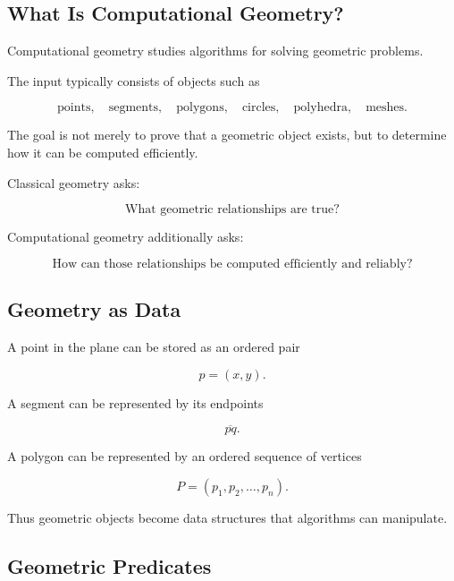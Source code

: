 \subsection{What Is Computational Geometry?}
\label{subsec:what-is-computational-geometry}

Computational geometry studies algorithms for solving geometric problems.

The input typically consists of objects such as

\[
\boxed{
\text{points},
\quad
\text{segments},
\quad
\text{polygons},
\quad
\text{circles},
\quad
\text{polyhedra},
\quad
\text{meshes}.
}
\]

The goal is not merely to prove that a geometric object exists, but to
determine how it can be computed efficiently.

\begin{conceptbox}
Classical geometry asks:

\[
\text{What geometric relationships are true?}
\]

Computational geometry additionally asks:

\[
\boxed{
\text{How can those relationships be computed efficiently and reliably?}
}
\]
\end{conceptbox}

\subsection{Geometry as Data}
\label{subsec:geometry-as-data}

A point in the plane can be stored as an ordered pair

\[
p=(x,y).
\]

A segment can be represented by its endpoints

\[
\overline{pq}.
\]

A polygon can be represented by an ordered sequence of vertices

\[
\boxed{
P=(p_1,p_2,\ldots,p_n).
}
\]

Thus geometric objects become data structures that algorithms can manipulate.

\subsection{Geometric Predicates}
\label{subsec:geometric-predicates}

